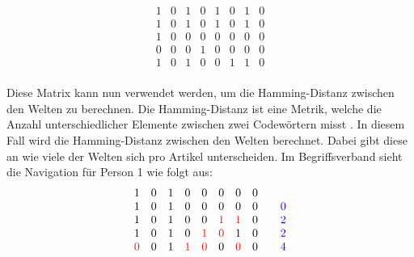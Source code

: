 \setcounter{equation}{0}
\begin{equation}
    \begin{matrix}
        1 & 0 & 1 & 0 & 1 & 0 & 1 & 0 \\
        1 & 0 & 1 & 0 & 1 & 0 & 1 & 0 \\
        1 & 0 & 0 & 0 & 0 & 0 & 0 & 0 \\
        0 & 0 & 0 & 1 & 0 & 0 & 0 & 0 \\
        1 & 0 & 1 & 0 & 0 & 1 & 1 & 0 \\
    \end{matrix}
\end{equation}

Diese Matrix kann nun verwendet werden, um die Hamming-Distanz zwischen den Welten zu berechnen.
Die Hamming-Distanz ist eine Metrik, welche die Anzahl unterschiedlicher Elemente zwischen zwei Codewörtern misst \cite{hamming-code}.
In diesem Fall wird die Hamming-Distanz zwischen den Welten berechnet.
Dabei gibt diese an wie viele der Welten sich pro Artikel unterscheiden.
Im Begriffsverband sieht die Navigation für Person 1 wie folgt aus:
\begin{equation}
    \begin{array}{ccccccccc}
        1                  & 0 & 1 & 0                  & 0                  & 0                  & 0                  & 0 &                                              \\
        1                  & 0 & 1 & 0                  & 0                  & 0                  & 0                  & 0 & \multicolumn{1}{r}{\quad\textcolor{blue}{0}} \\
        1                  & 0 & 1 & 0                  & 0                  & \textcolor{red}{1} & \textcolor{red}{1} & 0 & \multicolumn{1}{r}{\quad\textcolor{blue}{2}} \\
        1                  & 0 & 1 & 0                  & \textcolor{red}{1} & \textcolor{red}{0} & 1                  & 0 & \multicolumn{1}{r}{\quad\textcolor{blue}{2}} \\
        \textcolor{red}{0} & 0 & 1 & \textcolor{red}{1} & \textcolor{red}{0} & 0                  & \textcolor{red}{0} & 0 & \multicolumn{1}{r}{\quad\textcolor{blue}{4}} \\
    \end{array}
    \label{eq:hamming-distance}
\end{equation}

